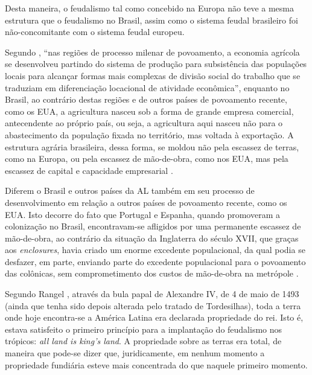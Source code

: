 \documentclass[
	12pt,				%
	oneside,			%
	a4paper,			%
	chapter=TITLE,		%
	section=TITLE,		%
	english,			%
	brazil				%
	]{abntex2}
\begin{document}
\begin{refsection}
Desta maneira, o feudalismo tal como concebido na Europa não teve a mesma
estrutura que o feudalismo no Brasil, assim como o sistema feudal brasileiro foi
não-concomitante com o sistema feudal europeu.

Segundo \textcite[p.~227]{furtado2009}, ``nas regiões de processo milenar de povoamento, a
economia agrícola se desenvolveu partindo do sistema de produção para
subsistência das populações locais para alcançar formas mais complexas de
divisão social do trabalho que se traduziam em diferenciação locacional de
atividade econômica'', enquanto no Brasil, ao contrário destas regiões e de
outros países de povoamento recente, como os \gls{EUA}, a agricultura nasceu sob
a forma de grande empresa comercial, antecendente ao próprio país, ou seja, a
agricultura aqui nasceu não para o abastecimento da população fixada no
território, mas voltada à exportação. A estrutura agrária brasileira, dessa
forma, se moldou não pela escassez de terras, como na Europa, ou pela escassez
de mão-de-obra, como nos \gls{EUA}, mas pela escassez de capital e capacidade
empresarial \autocite[228]{furtado2009}.

Diferem o Brasil e outros países da \gls{AL} também em seu processo de
desenvolvimento em relação a outros países de povoamento recente, como os
\gls{EUA}. Isto decorre do fato que Portugal e Espanha, quando promoveram a
colonização no Brasil, encontravam-se afligidos por uma permanente escassez de
mão-de-obra, ao contrário da situação da Inglaterra do século XVII, que graças
aos \emph{enclosures}, havia criado um enorme excedente populacional, da qual podia
se desfazer, em parte, enviando parte do excedente populacional para o
povoamento das colônicas, sem comprometimento dos custos de mão-de-obra na
metrópole \autocite[27]{furtado2005}.

Segundo Rangel \autocite*[726]{rangel1989}, através da bula papal de Alexandre IV, de 4
de maio de 1493 (ainda que tenha sido depois alterada pelo tratado de
Tordesilhas), toda a terra onde hoje encontra-se a América Latina era declarada
propriedade do rei. Isto é, estava satisfeito o primeiro princípio para a
implantação do feudalismo nos trópicos: \emph{all land is king's land}. A propriedade
sobre as terras era total, de maneira que pode-se dizer que, juridicamente, em
nenhum momento a propriedade fundiária esteve mais concentrada do que naquele
primeiro momento.


\end{refsection}
\end{document}

